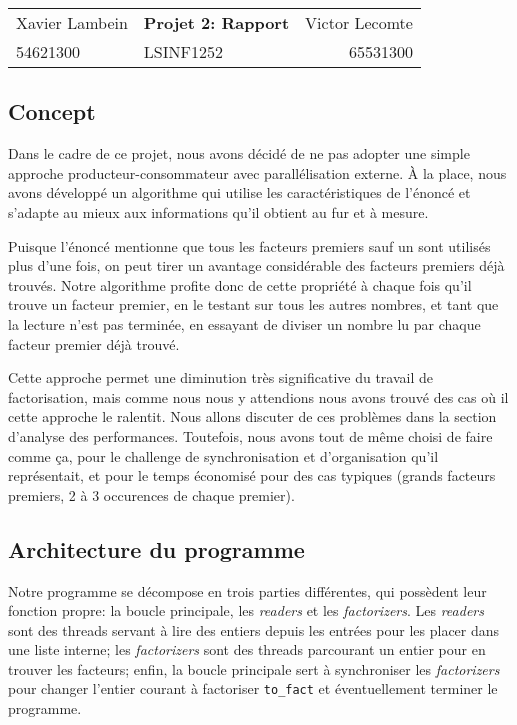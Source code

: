 \documentclass[a4paper,10pt]{article}
\begin{document}
\begin{center}
\begin{tabu} to \textwidth {lX[c]r}
    Xavier Lambein & \large{\textbf{Projet 2: Rapport}} & Victor Lecomte \\
    54621300 & LSINF1252 & 65531300 \\
    \hline
\end{tabu}
\end{center}

\vspace{0.7cm}

\subsection*{Concept}

Dans le cadre de ce projet, nous avons décidé de ne pas adopter une simple approche producteur-consommateur avec parallélisation externe. À la place, nous avons développé un algorithme qui utilise les caractéristiques de l'énoncé et s'adapte au mieux aux informations qu'il obtient au fur et à mesure.

Puisque l'énoncé mentionne que tous les facteurs premiers sauf un sont utilisés plus d'une fois, on peut tirer un avantage considérable des facteurs premiers déjà trouvés. Notre algorithme profite donc de cette propriété à chaque fois qu'il trouve un facteur premier, en le testant sur tous les autres nombres, et tant que la lecture n'est pas terminée, en essayant de diviser un nombre lu par chaque facteur premier déjà trouvé.

Cette approche permet une diminution très significative du travail de factorisation, mais comme nous nous y attendions nous avons trouvé des cas où il cette approche le ralentit. Nous allons discuter de ces problèmes dans la section d'analyse des performances. Toutefois, nous avons tout de même choisi de faire comme ça, pour le challenge de synchronisation et d'organisation qu'il représentait, et pour le temps économisé pour des cas typiques (grands facteurs premiers, 2 à 3 occurences de chaque premier).

\subsection*{Architecture du programme}

Notre programme se décompose en trois parties différentes, qui possèdent leur fonction propre: la boucle principale, les \emph{readers} et les \emph{factorizers}. Les \emph{readers} sont des threads servant à lire des entiers depuis les entrées pour les placer dans une liste interne; les \emph{factorizers} sont des threads parcourant un entier pour en trouver les facteurs; enfin, la boucle principale sert à synchroniser les \emph{factorizers} pour changer l'entier courant à factoriser \texttt{to\_fact} et éventuellement terminer le programme.
\end{document}
